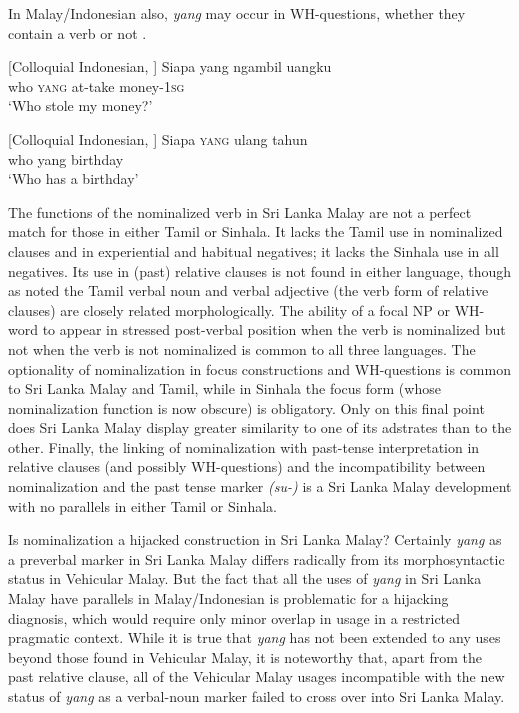 In Malay/Indonesian also, \textit{yang} may occur in WH-questions, whether they contain a verb  or not .

\ea\label{smith:ex:82}
{}[Colloquial Indonesian, \citet[15]{Englebretson2008}]
\gll Siapa yang ngambil uangku\\
who \textsc{yang} at-take money-1\textsc{sg}\\
`Who stole my money?'
\z


\ea\label{smith:ex:83}
{}[Colloquial Indonesian, \citet[15]{Englebretson2008}]
\gll Siapa \textsc{yang} ulang tahun\\
who yang birthday\\
`Who has a birthday'
\z


The functions of the nominalized verb in Sri Lanka Malay are not a perfect match for those in either Tamil or Sinhala. It lacks the Tamil use in nominalized clauses and in experiential and habitual negatives; it lacks the Sinhala use in all negatives. Its use in (past) relative clauses is not found in either language, though as noted the Tamil verbal noun and verbal adjective (the verb form of relative clauses) are closely related morphologically. The ability of a focal NP or WH-word to appear in stressed post-verbal position when the verb is nominalized but not when the verb is not nominalized is common to all three languages. The optionality of nominalization in focus constructions and WH-questions is common to Sri Lanka Malay and Tamil, while in Sinhala the focus form (whose nominalization function is now obscure) is obligatory. Only on this final point does Sri Lanka Malay display greater similarity to one of its adstrates than to the other. Finally, the linking of nominalization with past-tense interpretation in relative clauses (and possibly WH-questions) and the incompatibility between nominalization and the past tense marker \textit{(su-)} is a Sri Lanka Malay development with no parallels in either Tamil or Sinhala.

Is nominalization a hijacked construction in Sri Lanka Malay? Certainly \textit{yang }as a preverbal marker in Sri Lanka Malay differs radically from its morphosyntactic status in Vehicular Malay. But the fact that all the uses of \textit{yang} in Sri Lanka Malay have parallels in Malay/Indonesian is problematic for a hijacking diagnosis, which would require only minor overlap in usage in a restricted pragmatic context. While it is true that \textit{yang} has not been extended to any uses beyond those found in Vehicular Malay, it is noteworthy that, apart from the past relative clause, all of the Vehicular Malay usages incompatible with the new status of \textit{yang }as a verbal-noun marker failed to cross over into Sri Lanka Malay. 

